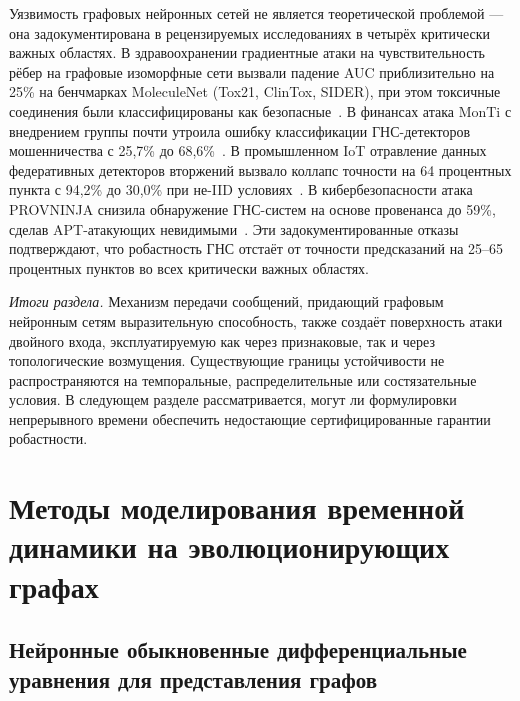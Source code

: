 Уязвимость графовых нейронных сетей не является теоретической проблемой --- она задокументирована в рецензируемых исследованиях в четырёх критически важных областях. В здравоохранении градиентные атаки на чувствительность рёбер на графовые изоморфные сети вызвали падение AUC приблизительно на 25\% на бенчмарках MoleculeNet (Tox21, ClinTox, SIDER), при этом токсичные соединения были классифицированы как безопасные~\cite{EdgeSensitivity2025}. В финансах атака MonTi с внедрением группы почти утроила ошибку классификации ГНС-детекторов мошенничества с 25,7\% до 68,6\%~\cite{MonTi2025}. В промышленном IoT отравление данных федеративных детекторов вторжений вызвало коллапс точности на 64 процентных пункта с 94,2\% до 30,0\% при не-IID условиях~\cite{FerragPoisoning2023}. В кибербезопасности атака PROVNINJA снизила обнаружение ГНС-систем на основе провенанса до 59\%, сделав APT-атакующих невидимыми~\cite{PROVNINJA2023}. Эти задокументированные отказы подтверждают, что робастность ГНС отстаёт от точности предсказаний на 25--65 процентных пунктов во всех критически важных областях.

\medskip
\noindent\textit{Итоги раздела.} Механизм передачи сообщений, придающий графовым нейронным сетям выразительную способность, также создаёт поверхность атаки двойного входа, эксплуатируемую как через признаковые, так и через топологические возмущения. Существующие границы устойчивости не распространяются на темпоральные, распределительные или состязательные условия. В следующем разделе рассматривается, могут ли формулировки непрерывного времени обеспечить недостающие сертифицированные гарантии робастности.


\section{Методы моделирования временной динамики на эволюционирующих графах}
\label{sec:ct_dynamics}

\subsection{Нейронные обыкновенные дифференциальные уравнения для представления графов}

